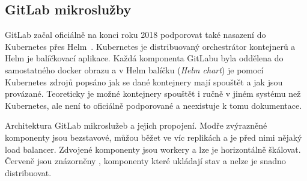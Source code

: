     \subsection{GitLab mikroslužby}
        GitLab začal oficiálně na konci roku 2018 podporovat také nasazení do Kubernetes přes Helm~\cite{gitlab-helm-chart}. Kubernetes je distribuovaný orchestrátor kontejnerů a Helm je balíčkovací aplikace. Každá komponenta GitLabu byla oddělena do samostatného docker obrazu a v Helm balíčku (\textit{Helm chart}) je pomocí Kubernetes zdrojů popsáno jak se dané kontejnery mají spouštět a jak jsou provázané. Teoreticky je možné kontejnery spouštět i ručně v jiném systému než Kubernetes, ale není to oficiálně podporované a neexistuje k tomu dokumentace.

        \begin{iffigure}
            \centering
            \caption{Architektura GitLab mikroslužeb a jejich propojení. Modře zvýrazněné komponenty jsou bezstavové, můžou běžet ve víc replikách a je před nimi nějaký load balancer. Zdvojené komponenty jsou workery a lze je horizontálně škálovat. Červeně jsou znázorněny , komponenty které ukládají stav a nelze je snadno distribuovat.}
            \label{pic:gitlab-architecture}
        \end{iffigure}

